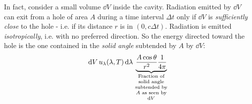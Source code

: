 \documentclass[../../main.tex]{subfiles}
\begin{document}

In fact, consider a small volume $\dd{V}$ inside the cavity. Radiation emitted by $\dd{V}$ can exit from a hole of area $A$ during a time interval $\Delta t$ only if $\dd{V}$ is \textit{sufficiently close} to the hole - i.e. if its distance $r$ is in $(0, c \Delta t)$. Radiation is emitted \textit{isotropically}, i.e. with no preferred direction. So the energy directed toward the hole is the one contained in the \textit{solid angle} subtended by $A$  by $\dd{V}$:
\begin{align*}
    \dd{V} u_\lambda (\lambda, T) \dd{\lambda} \underbrace{\frac{A \cos \theta}{r^2} \frac{1}{4 \pi}  }_{\parbox{5em}{\centering \scriptsize Fraction of solid angle subtended by $A$ as seen by $\dd{V}$}} 
\end{align*}  %

\begin{exo}[8]
    
\end{exo}

\begin{exo}[9]
    
\end{exo}
\end{document}
